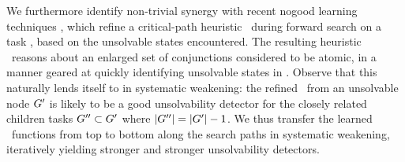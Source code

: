 %
%
%
%
%
%
%

We furthermore identify non-trivial synergy with recent nogood
learning techniques \cite{steinmetz:hoffmann:ai-17}, which refine a
critical-path heuristic \hc\ during forward search on a task \task,
based on the unsolvable states encountered. The resulting heuristic
\hc\ reasons about an enlarged set of conjunctions considered to be
atomic, in a manner geared at quickly identifying unsolvable states in
\task. Observe that this naturally lends itself to
 in systematic weakening: the refined \hc\ from
an unsolvable node $G'$ is likely to be a good unsolvability
detector for the closely related children tasks $G'' \subset
G'$ where $|G''| = |G'|-1$. We thus transfer the learned
\hc\ functions from top to bottom along the search paths in systematic
weakening, iteratively yielding stronger and stronger unsolvability
detectors. 
%
%



